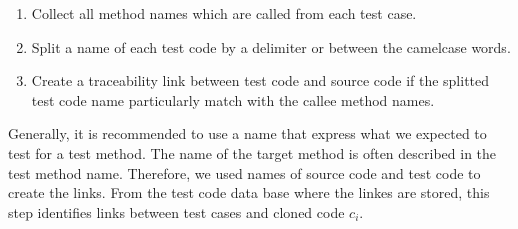 \documentclass[conference]{IEEEtran}
\begin{document}


\begin{enumerate}
\renewcommand{\labelenumi}{(\arabic{enumi})}
\item  Collect all method names which are called from each test case.
\item  Split a name of each test code by a delimiter or between the camelcase words.
\item  Create a traceability link between test code and source code if the splitted test code name particularly match with the callee method names.
\end{enumerate}

Generally, it is recommended to use a name that express what we expected to test for a test method. The name of the target method is often described in the test method name\cite{b22}. Therefore, we used names of source code and test code to create the links. From the test code data base where the linkes are stored, this step identifies links between test cases and cloned code $c_i$. 


\end{document}
